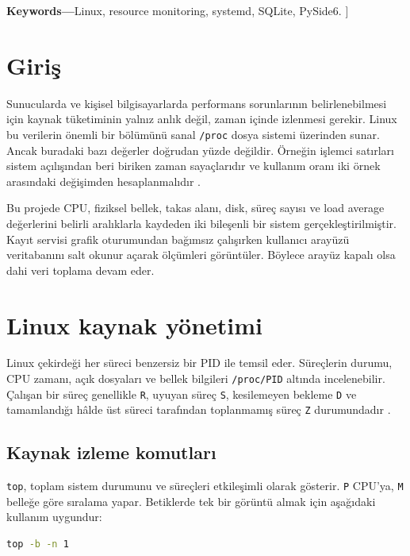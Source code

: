 \documentclass[9pt,a4paper,twocolumn]{extarticle}
\newcommand{\keywordsname}{\textbf{Keywords---}}
\begin{document}
\vspace{4pt}
\noindent\keywordsname Linux, resource monitoring, systemd, SQLite, PySide6.
\vspace{10pt}
]

\shorthandoff{=}
\section{Giriş}

Sunucularda ve kişisel bilgisayarlarda performans sorunlarının belirlenebilmesi için kaynak tüketiminin yalnız anlık değil, zaman içinde izlenmesi gerekir. Linux bu verilerin önemli bir bölümünü sanal \texttt{/proc} dosya sistemi üzerinden sunar. Ancak buradaki bazı değerler doğrudan yüzde değildir. Örneğin işlemci satırları sistem açılışından beri biriken zaman sayaçlarıdır ve kullanım oranı iki örnek arasındaki değişimden hesaplanmalıdır \cite{procstat}.

Bu projede CPU, fiziksel bellek, takas alanı, disk, süreç sayısı ve load average değerlerini belirli aralıklarla kaydeden iki bileşenli bir sistem gerçekleştirilmiştir. Kayıt servisi grafik oturumundan bağımsız çalışırken kullanıcı arayüzü veritabanını salt okunur açarak ölçümleri görüntüler. Böylece arayüz kapalı olsa dahi veri toplama devam eder.

\section{Linux kaynak yönetimi}

Linux çekirdeği her süreci benzersiz bir PID ile temsil eder. Süreçlerin durumu, CPU zamanı, açık dosyaları ve bellek bilgileri \texttt{/proc/PID} altında incelenebilir. Çalışan bir süreç genellikle \texttt{R}, uyuyan süreç \texttt{S}, kesilemeyen bekleme \texttt{D} ve tamamlandığı hâlde üst süreci tarafından toplanmamış süreç \texttt{Z} durumundadır \cite{procman}.

\subsection{Kaynak izleme komutları}

\texttt{top}, toplam sistem durumunu ve süreçleri etkileşimli olarak gösterir. \texttt{P} CPU'ya, \texttt{M} belleğe göre sıralama yapar. Betiklerde tek bir görüntü almak için aşağıdaki kullanım uygundur:

\begin{lstlisting}[language=bash]
top -b -n 1
\end{lstlisting}
\end{document}
